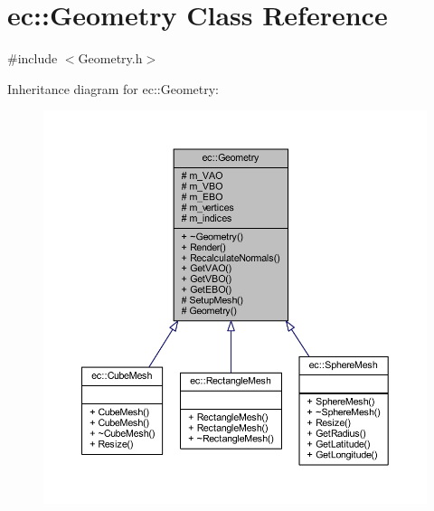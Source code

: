 \hypertarget{classec_1_1_geometry}{}\section{ec\+:\+:Geometry Class Reference}
\label{classec_1_1_geometry}


{\ttfamily \#include $<$Geometry.\+h$>$}



Inheritance diagram for ec\+:\+:Geometry\+:\nopagebreak
\begin{figure}[H]
\begin{center}
\leavevmode
\includegraphics[width=350pt]{classec_1_1_geometry__inherit__graph}
\end{center}
\end{figure}


